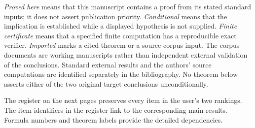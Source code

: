 \documentclass[11pt,a4paper]{article}
\numberwithin{equation}{section}
\theoremstyle{definition}
\theoremstyle{remark}
\begin{document}
\emph{Proved here} means that this manuscript contains a proof from its
stated standard inputs; it does not assert publication priority.
\emph{Conditional} means that the implication is established while a
displayed hypothesis is not supplied.  \emph{Finite certificate} means
that a specified finite computation has a reproducible exact verifier.
\emph{Imported} marks a cited theorem or a source-corpus input.
The corpus documents are working manuscripts rather than independent
external validation of the conclusions.  Standard external results and
the authors' source computations are identified separately in the
bibliography.  No theorem below asserts either of the two original
target conclusions unconditionally.

The register on the next pages preserves every item in the user's two
rankings.  The item identifiers in the register link to the corresponding main
results. Formula numbers and theorem labels provide the detailed dependencies.
\end{document}
